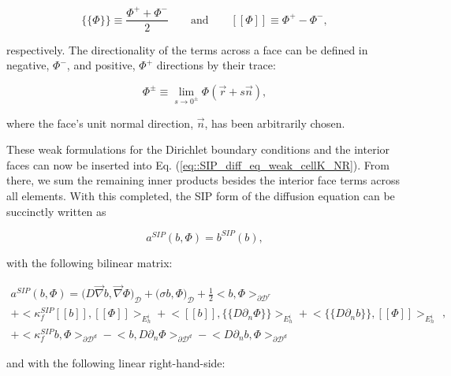 \begin{equation}
\label{eq::solution_mean_and_jump}
\{\!\{  \Phi \}\!\} \equiv \frac{\Phi^+ + \Phi^-}{2} \qquad \text{and} \qquad [\![   \Phi ]\!] \equiv \Phi^+ - \Phi^- ,
\end{equation}

\noindent respectively. The directionality of the terms across a face can be defined in negative, $\Phi^-$, and positive, $\Phi^+$ directions by their trace:

\begin{equation}
\label{eq::solution_trace}
\Phi^{\pm} \equiv \lim_{s \rightarrow 0^{\pm}} \Phi (\vec{r} + s \vec{n}),
\end{equation}

\noindent where the face's unit normal direction, $\vec{n}$, has been arbitrarily chosen.

These weak formulations for the Dirichlet boundary conditions and the interior faces can now be inserted into Eq. (\ref{eq::SIP_diff_eq_weak_cellK_NR}). From there, we sum the remaining inner products besides the interior face terms across all elements. With this completed, the SIP form of the diffusion equation can be succinctly written as

\begin{equation}
a^{SIP}( b, \Phi) = b^{SIP}(b),
\label{eq::SIP_weak_form}
\end{equation}

\noindent with the following bilinear matrix:

\begin{equation}
\label{eq::SIP_bilinear_form}
\begin{aligned}
a^{SIP}( b, \Phi)  = \Big(  D \vec{\nabla}  b , \vec{\nabla} \Phi  \Big)_{\mathcal{D}} + \Big(  \sigma   b ,  \Phi  \Big)_{\mathcal{D}}  +  \frac{1}{2} \Big<    b , \Phi \Big>_{\partial \mathcal{D}^r}   \\
+  \Big< \kappa_f^{SIP} [\![   b ]\!] , [\![  \Phi ]\!]\Big>_{E_h^i} + \Big<  [\![   b ]\!] , \{\!\{  D \partial_n \Phi \}\!\}\Big>_{E_h^i}  + \Big< \{\!\{  D \partial_n  b \}\!\} , [\![ \Phi ]\!]\Big>_{E_h^i} \\
+ \Big< \kappa_f^{SIP}   b ,   \Phi \Big>_{\partial \mathcal{D}^d} - \Big<   b  ,  D \partial_n \Phi \Big>_{\partial \mathcal{D}^d} - \Big<   D 				\partial_n  b , \Phi \Big>_{\partial \mathcal{D}^d}  
\end{aligned} ,
\end{equation}

\noindent and with the following linear right-hand-side:

